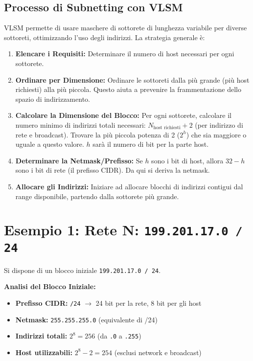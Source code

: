 \subsection{Processo di Subnetting con VLSM}
VLSM permette di usare maschere di sottorete di lunghezza variabile per diverse sottoreti, ottimizzando l'uso degli indirizzi. La strategia generale è:
\begin{enumerate}
    \item \textbf{Elencare i Requisiti:} Determinare il numero di host necessari per ogni sottorete.
    \item \textbf{Ordinare per Dimensione:} Ordinare le sottoreti dalla più grande (più host richiesti) alla più piccola. Questo aiuta a prevenire la frammentazione dello spazio di indirizzamento.
    \item \textbf{Calcolare la Dimensione del Blocco:} Per ogni sottorete, calcolare il numero minimo di indirizzi totali necessari: $N_{\text{host richiesti}} + 2$ (per indirizzo di rete e broadcast). Trovare la più piccola potenza di 2 ($2^h$) che sia maggiore o uguale a questo valore. $h$ sarà il numero di bit per la parte host.
    \item \textbf{Determinare la Netmask/Prefisso:} Se $h$ sono i bit di host, allora $32 - h$ sono i bit di rete (il prefisso CIDR). Da qui si deriva la netmask.
    \item \textbf{Allocare gli Indirizzi:} Iniziare ad allocare blocchi di indirizzi contigui dal range disponibile, partendo dalla sottorete più grande.
\end{enumerate}

\newpage
\section{Esempio 1: Rete N: \texttt{199.201.17.0 / 24}}
Si dispone di un blocco iniziale \texttt{199.201.17.0 / 24}.

\textbf{Analisi del Blocco Iniziale:}
\begin{itemize}
    \item \textbf{Prefisso CIDR:} \texttt{/24} $\rightarrow$ 24 bit per la rete, 8 bit per gli host
    \item \textbf{Netmask:} \texttt{255.255.255.0} (equivalente di /24)
    \item \textbf{Indirizzi totali:} $2^8 = 256$ (da \texttt{.0} a \texttt{.255})
    \item \textbf{Host utilizzabili:} $2^8 - 2 = 254$ (esclusi network e broadcast)
\end{itemize}

